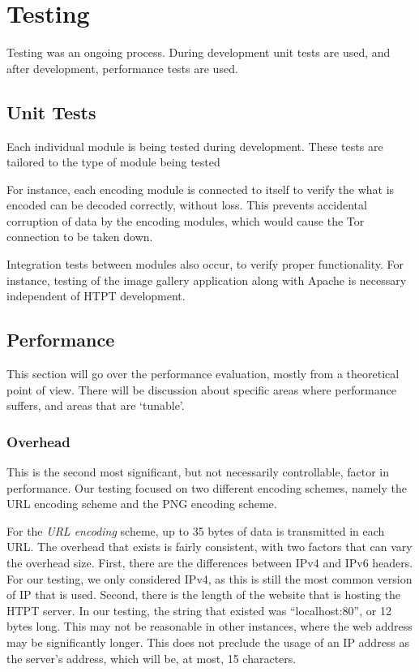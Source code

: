 \section{Testing}

Testing was an ongoing process. During development unit tests are used, and after development, performance tests are used. 

\subsection{Unit Tests}
Each individual module is being tested during development. These tests are tailored to the type of module being tested

For instance, each encoding module is connected to itself to verify the what is encoded can be decoded correctly, without loss. This prevents accidental corruption of data by the encoding modules, which would cause the Tor connection to be taken down.

Integration tests between modules also occur, to verify proper functionality. For instance, testing of the image gallery application along with Apache is necessary independent of HTPT development. 

\subsection{Performance}

This section will go over the performance evaluation, mostly from a theoretical point of view. There will be discussion about specific areas where performance suffers, and areas that are `tunable'.

\subsubsection{Overhead}
This is the second most significant, but not necessarily controllable, factor in performance. Our testing focused on two different encoding schemes, namely the URL encoding scheme and the PNG encoding scheme.

For the \emph{URL encoding} scheme, up to 35 bytes of data is transmitted in each URL. The overhead that exists is fairly consistent, with two factors that can vary the overhead size. First, there are the differences between IPv4 and IPv6 headers. For our testing, we only considered IPv4, as this is still the most common version of IP that is used. Second, there is the length of the website that is hosting the HTPT server. In our testing, the string that existed was ``localhost:80'', or 12 bytes long. This may not be reasonable in other instances, where the web address may be significantly longer. This does not preclude the usage of an IP address as the server's address, which will be, at most, 15 characters. 

